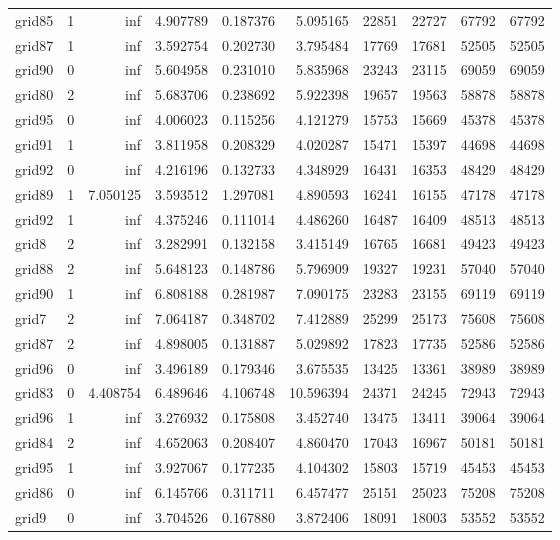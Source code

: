 \begin{longtable}{|l|r|r|r|r|r|r|r|r|r|}
grid85 & 1 & inf & 4.907789 & 0.187376 & 5.095165 & 22851 & 22727 & 67792 & 67792 \\
grid87 & 1 & inf & 3.592754 & 0.202730 & 3.795484 & 17769 & 17681 & 52505 & 52505 \\
grid90 & 0 & inf & 5.604958 & 0.231010 & 5.835968 & 23243 & 23115 & 69059 & 69059 \\
grid80 & 2 & inf & 5.683706 & 0.238692 & 5.922398 & 19657 & 19563 & 58878 & 58878 \\
grid95 & 0 & inf & 4.006023 & 0.115256 & 4.121279 & 15753 & 15669 & 45378 & 45378 \\
grid91 & 1 & inf & 3.811958 & 0.208329 & 4.020287 & 15471 & 15397 & 44698 & 44698 \\
grid92 & 0 & inf & 4.216196 & 0.132733 & 4.348929 & 16431 & 16353 & 48429 & 48429 \\
grid89 & 1 & 7.050125 & 3.593512 & 1.297081 & 4.890593 & 16241 & 16155 & 47178 & 47178 \\
grid92 & 1 & inf & 4.375246 & 0.111014 & 4.486260 & 16487 & 16409 & 48513 & 48513 \\
grid8 & 2 & inf & 3.282991 & 0.132158 & 3.415149 & 16765 & 16681 & 49423 & 49423 \\
grid88 & 2 & inf & 5.648123 & 0.148786 & 5.796909 & 19327 & 19231 & 57040 & 57040 \\
grid90 & 1 & inf & 6.808188 & 0.281987 & 7.090175 & 23283 & 23155 & 69119 & 69119 \\
grid7 & 2 & inf & 7.064187 & 0.348702 & 7.412889 & 25299 & 25173 & 75608 & 75608 \\
grid87 & 2 & inf & 4.898005 & 0.131887 & 5.029892 & 17823 & 17735 & 52586 & 52586 \\
grid96 & 0 & inf & 3.496189 & 0.179346 & 3.675535 & 13425 & 13361 & 38989 & 38989 \\
grid83 & 0 & 4.408754 & 6.489646 & 4.106748 & 10.596394 & 24371 & 24245 & 72943 & 72943 \\
grid96 & 1 & inf & 3.276932 & 0.175808 & 3.452740 & 13475 & 13411 & 39064 & 39064 \\
grid84 & 2 & inf & 4.652063 & 0.208407 & 4.860470 & 17043 & 16967 & 50181 & 50181 \\
grid95 & 1 & inf & 3.927067 & 0.177235 & 4.104302 & 15803 & 15719 & 45453 & 45453 \\
grid86 & 0 & inf & 6.145766 & 0.311711 & 6.457477 & 25151 & 25023 & 75208 & 75208 \\
grid9 & 0 & inf & 3.704526 & 0.167880 & 3.872406 & 18091 & 18003 & 53552 & 53552 \\

\end{longtable}
